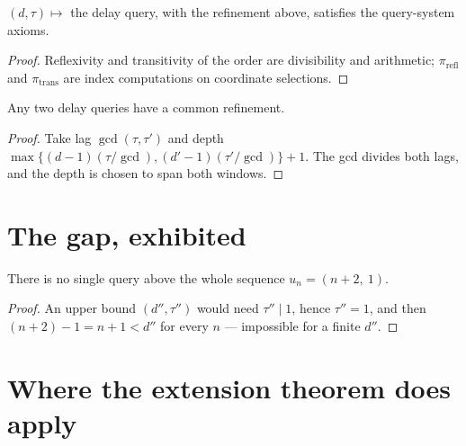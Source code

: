 \begin{theorem}
\label{thm:delay-qs}
\leanok
$(d,\tau) \mapsto$ the delay query, with the refinement above, satisfies the
query-system axioms.
\end{theorem}

\begin{proof}
\leanok
{}
Reflexivity and transitivity of the order are divisibility and arithmetic;
$\pi_{\mathrm{refl}}$ and $\pi_{\mathrm{trans}}$ are index computations on
coordinate selections.
\end{proof}

\begin{theorem}
\label{thm:delay-upper}
\leanok
Any two delay queries have a common refinement.
\end{theorem}

\begin{proof}
\leanok
{}
Take lag $\gcd(\tau,\tau')$ and depth
$\max\{(d-1)(\tau/\gcd), (d'-1)(\tau'/\gcd)\} + 1$. The gcd divides both lags,
and the depth is chosen to span both windows.
\end{proof}

\section{The gap, exhibited}

\begin{theorem}
\label{thm:delay-not-sud}
\leanok
There is no single query above the whole sequence $u_n = (n+2,\ 1)$.
\end{theorem}

\begin{proof}
\leanok
{}
An upper bound $(d'',\tau'')$ would need $\tau'' \mid 1$, hence $\tau''=1$, and
then $(n+2)-1 = n+1 < d''$ for every $n$ --- impossible for a finite $d''$.
\end{proof}

\section{Where the extension theorem does apply}

